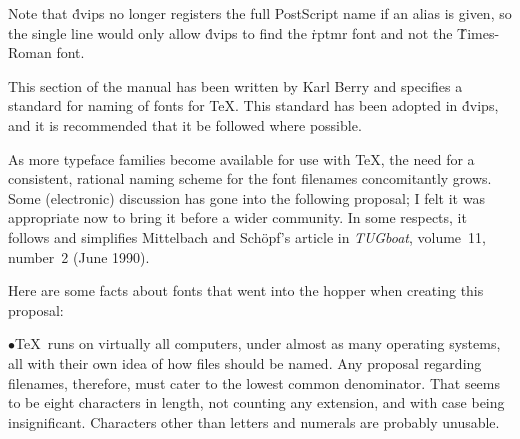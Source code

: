 Note that \.{dvips} no longer registers the full PostScript name if an
alias is given, so the single line
\noindent
would only allow \.{dvips} to find the \.{rptmr} font and not the
\.{Times-Roman} font.


{\def\journal#1{{\sl #1}}
\def\table{\vbox\bgroup
\vskip\parskip\halign\bgroup\strut\indent\tt ##\hfil\quad
    &\vtop{%
       \advance\hsize by -\parindent %
       \advance\hsize by -1em        %
       \advance\hsize by -2\fontdimen7\tentt
       \rm\noindent ##}\hfil
    \cr}
\def\setuphsize{%
       \advance\hsize by -\parindent %
       \divide\hsize by 2            %
       \advance\hsize by -1.5em      %
       \advance\hsize by -2\fontdimen7\tentt}
\def\dtable{\vbox\bgroup\vskip\parskip\halign\bgroup\strut
    \indent##&\tt ##\hfil\quad
    &\vtop{\setuphsize\rm\noindent ##}\hfil&\quad\tt ##\hfil\quad
    &\vtop{\setuphsize\rm\noindent ##}\hfil\cr}
\def\endtable{%
  \egroup\egroup %
  \smallskip %
}
\def\entry#1#2{#1&#2\cr}
\def\mitem{\item{$\bullet$}}
\def\\{\hfil\break}

This section of the manual has been written by Karl Berry and
specifies a standard for naming of fonts for \TeX.  This standard has
been adopted in \.{dvips}, and it is recommended that it be followed
where possible.

As more typeface families become available for use with \TeX, the need
for a consistent, rational naming scheme for the font filenames
concomitantly grows. Some (electronic) discussion has gone into the
following proposal; I felt it was appropriate now to bring it before a
wider community.  In some respects, it follows and simplifies
Mittelbach and Sch\"opf's article in \journal{TUGboat}, volume~11,
number~2 (June 1990).

Here are some facts about fonts that went into the hopper when creating
this proposal:

\mitem \TeX\ runs on virtually all computers, under almost as many operating
systems, all with their own idea of how files should be named.  Any
proposal regarding filenames, therefore, must cater to the lowest common
denominator.  That seems to be eight characters in length, not counting any
extension, and with case being insignificant.  Characters other
than letters and numerals are probably unusable.

}
